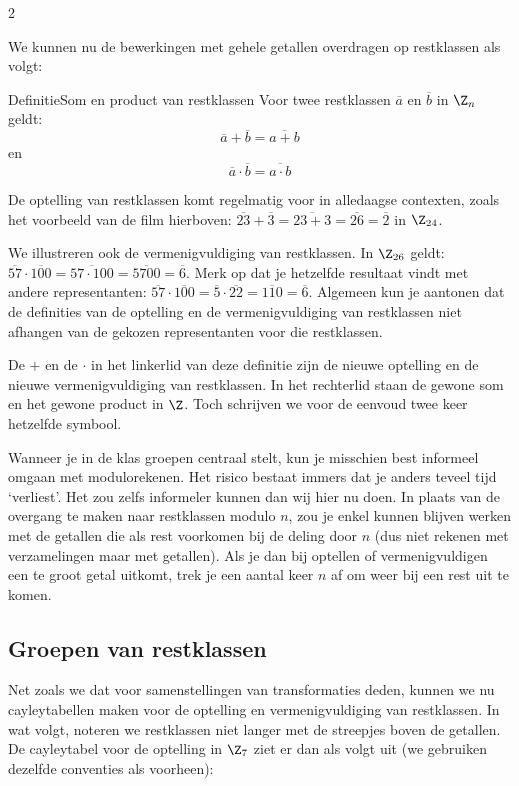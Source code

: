 \begin{multicols}{2}
	
	We kunnen nu de bewerkingen met gehele getallen overdragen op restklassen als volgt:
	\begin{kader}{Definitie}{Som en product van restklassen}
		 Voor twee restklassen $\overline{a}$ en $\overline b$ in $\Z_n$ geldt: $$\overline{a}+\overline{b}=\overline{a+b}$$ en $$\overline{a}\cdot\overline{b}=\overline{a\cdot b}$$
	\end{kader}
	
	De optelling van restklassen komt regelmatig voor in alledaagse contexten, zoals het voorbeeld van de film hierboven: $\overline{23}+\overline{3}= \overline{23+3}=\overline{26}=\overline{2}$ in $\Z_{24}$. 
 
 We illustreren ook de vermenigvuldiging van restklassen. In $\Z_{26}$ geldt: $\overline{57}\cdot \overline{100}= \overline{57\cdot 100}=\overline{5700}=\overline{6}$. Merk op dat je hetzelfde resultaat vindt met andere representanten: $\overline{57}\cdot \overline{100}=\overline{5}\cdot \overline{22}= \overline{110}=\overline{6}$.  Algemeen kun je aantonen dat de definities van de optelling en de vermenigvuldiging van restklassen niet afhangen van de gekozen representanten voor die restklassen.
		
	De $+$ en de $\cdot$ in het linkerlid van deze definitie zijn de nieuwe optelling en de nieuwe vermenigvuldiging van restklassen. In het rechterlid staan de gewone som en het gewone product in $\Z$. Toch schrijven we voor de eenvoud twee keer hetzelfde symbool.
	
	
	
	
 	Wanneer je in de klas groepen centraal stelt, kun je misschien best informeel omgaan met modulorekenen. Het risico bestaat immers dat je anders teveel tijd `verliest'. Het zou zelfs informeler kunnen dan wij hier nu doen. In plaats van de overgang te maken naar restklassen modulo $n$, zou je enkel kunnen blijven werken met de getallen die als rest voorkomen bij de deling door $n$ (dus niet rekenen met verzamelingen maar met getallen). Als je dan bij optellen of vermenigvuldigen een te groot getal uitkomt, trek je een aantal keer $n$ af om weer bij een rest uit te komen.
 	
 	
	\subsection{Groepen van restklassen}
	
	Net zoals we dat voor samenstellingen van transformaties deden, kunnen we nu cayleytabellen maken voor de optelling en vermenigvuldiging van restklassen. In wat volgt, noteren we restklassen niet langer met de streepjes boven de getallen. De cayleytabel voor de optelling in $\Z_7$ ziet er dan als volgt uit (we gebruiken dezelfde conventies als voorheen):
		

\end{multicols}

